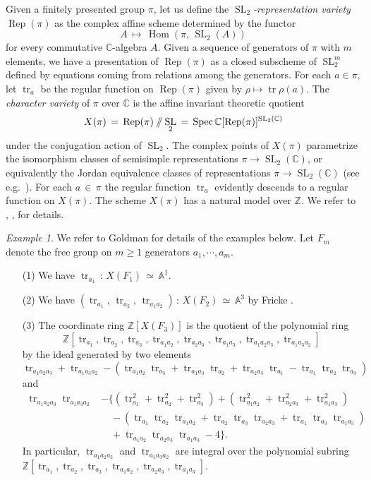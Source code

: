 \documentclass[reqno]{amsart}
\theoremstyle{plain}
\theoremstyle{definition}
\theoremstyle{remark}
\newtheorem{example}[theorem]{Example}
\newcommand{\A}{{\mathbb{A}}}
\newcommand{\C}{{\mathbb{C}}}
\newcommand{\Z}{{\mathbb{Z}}}
\DeclareMathOperator{\Hom}{Hom}
\DeclareMathOperator{\Rep}{Rep}
\DeclareMathOperator{\SL}{SL}
\DeclareMathOperator{\Spec}{Spec}
\DeclareMathOperator{\tr}{tr}
\newcommand{\git}{\mathbin{
  \mathchoice{/\mkern-6mu/}%
    {/\mkern-6mu/}%
    {/\mkern-5mu/}%
    {/\mkern-5mu/}}}%
\begin{document}
Given a finitely presented group $\pi$, let us define the \emph{$\SL_2$-representation variety} $\Rep(\pi)$ as
the complex affine scheme determined by the functor
$$A\,\mapsto\,\Hom(\pi,\,\SL_2(A))$$
for every commutative $\C$-algebra $A$. Given a sequence of generators of $\pi$ with $m$ elements, we have a presentation of $\Rep(\pi)$ as a closed subscheme of $\SL_2^m$ defined by equations coming from relations among the generators. For each $a\in\pi$, let $\tr_a$ be the regular function on $\Rep(\pi)$ given by $\rho\mapsto\tr\rho(a)$. The \emph{character variety} of $\pi$ over $\C$ is the affine invariant theoretic quotient
$$X(\pi)\,=\,\Rep(\pi)\git\SL_2\,=\,\Spec\C[\Rep(\pi)]^{\SL_2(\C)}$$
under the  conjugation action of $\SL_2$. The complex points of $X(\pi)$ parametrize the isomorphism
classes of semisimple representations $\pi\to \SL_2(\C)$, or equivalently the Jordan equivalence classes
of representations $\pi\to\SL_2(\C)$ (see e.g.~\cite[Proposition 6.1]{simpson}). For each $a\,\in\,\pi$ the
regular function $\tr_{a}$ evidently descends to a regular function on $X(\pi)$. The
scheme $X(\pi)$ has a natural model over $\Z$. We refer to \cite{horowitz}, \cite{ps}, \cite{saito} for details.

\begin{example}
\label{exfree}
We refer to Goldman \cite{goldman2} for details of the examples below. Let $F_m$ denote the free group on $m\geq1$ generators $a_1,\cdots,a_m$.
\begin{enumerate}
	\item[(1)] We have $\tr_{a_1}\,:\,X(F_1)\,\simeq\,\A^1$.
	\item[(2)] We have $(\tr_{a_1},\,\tr_{a_2},\,\tr_{a_1a_2})\,:\,X(F_2)\,\simeq\,\A^3$ by Fricke
\cite[Section 2.2]{goldman2}.
	\item[(3)] The coordinate ring $\Z[X(F_3)]$ is the quotient of the polynomial ring
	$$\Z[\tr_{a_1},\tr_{a_2},\tr_{a_3},\tr_{a_1a_2},\tr_{a_2a_3},\tr_{a_1a_3},\tr_{a_1a_2a_3},\tr_{a_1a_3a_2}]$$
	by the ideal generated by two elements
$$
\tr_{a_1a_2a_3}+\tr_{a_1a_3a_2}-(\tr_{a_1a_2}\tr_{a_3}+\tr_{a_1a_3}\tr_{a_2}+\tr_{a_2a_3}\tr_{a_1}-\tr_{a_1}\tr_{a_2}\tr_{a_3})
$$
and
\begin{align*}
\tr_{a_1a_2a_3}\tr_{a_1a_3a_2}&-\{(\tr_{a_1}^2+\tr_{a_2}^2+\tr_{a_3}^2)+(\tr_{a_1a_2}^2+\tr_{a_2a_3}^2+\tr_{a_1a_3}^2)&\\
&\quad -(\tr_{a_1}\tr_{a_2}\tr_{a_1a_2}+\tr_{a_2}\tr_{a_3}\tr_{a_2a_3}+\tr_{a_1}\tr_{a_3}\tr_{a_1a_3})\\
&\quad +\tr_{a_1a_2}\tr_{a_2a_3}\tr_{a_1a_3}-4\}.
\end{align*}
In particular, $\tr_{a_1a_2a_3}$ and  $\tr_{a_1a_3a_2}$ are integral over the polynomial subring $\Z[\tr_{a_1},\tr_{a_2},\tr_{a_3},\tr_{a_1a_2},\tr_{a_2a_3},\tr_{a_1a_3}]$.
\end{enumerate}
\end{example}
\end{document}
